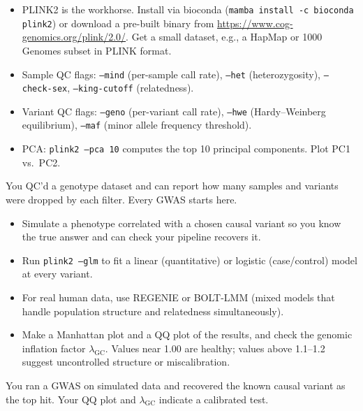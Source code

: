 \begin{itemize}[nosep]
  \item PLINK2 is the workhorse. Install via bioconda (\texttt{mamba install -c bioconda plink2}) or download a pre-built binary from \url{https://www.cog-genomics.org/plink/2.0/}. Get a small dataset, e.g., a HapMap or 1000 Genomes subset in PLINK format.
  \item Sample QC flags: \texttt{--mind} (per-sample call rate), \texttt{--het} (heterozygosity), \texttt{--check-sex}, \texttt{--king-cutoff} (relatedness).
  \item Variant QC flags: \texttt{--geno} (per-variant call rate), \texttt{--hwe} (Hardy--Weinberg equilibrium), \texttt{--maf} (minor allele frequency threshold).
  \item PCA: \texttt{plink2 --pca 10} computes the top 10 principal components. Plot PC1 vs.\ PC2.
\end{itemize}
\begin{winbox}[Checkpoint]
You QC'd a genotype dataset and can report how many samples and variants were dropped by each filter. Every GWAS starts here.
\end{winbox}

\begin{itemize}[nosep]
  \item Simulate a phenotype correlated with a chosen causal variant so you know the true answer and can check your pipeline recovers it.
  \item Run \texttt{plink2 --glm} to fit a linear (quantitative) or logistic (case/control) model at every variant.
  \item For real human data, use REGENIE or BOLT-LMM (mixed models that handle population structure and relatedness simultaneously).
  \item Make a Manhattan plot and a QQ plot of the results, and check the genomic inflation factor $\lambda_\text{GC}$. Values near 1.00 are healthy; values above 1.1--1.2 suggest uncontrolled structure or miscalibration.
\end{itemize}
\begin{winbox}[Checkpoint]
You ran a GWAS on simulated data and recovered the known causal variant as the top hit. Your QQ plot and $\lambda_\text{GC}$ indicate a calibrated test.
\end{winbox}

